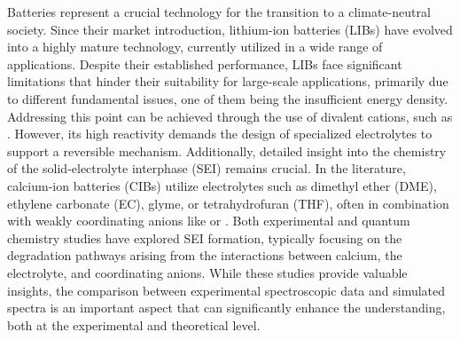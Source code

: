 \documentclass[journal=jpccck,manuscript=article]{achemso}
\begin{document}
Batteries represent a crucial technology for the transition to a climate-neutral society. Since their market introduction, lithium-ion batteries (LIBs) have evolved into a highly mature technology, currently utilized in a wide range of applications.\cite{zubiLithiumionBatteryState2018,kimLithiumionBatteriesOutlook2019} Despite their established performance, LIBs face significant limitations that hinder their suitability for large-scale applications, primarily due to different fundamental issues, one of them being the insufficient energy density.\cite{luReviewKeyIssues2013,li30YearsLithiumIon2018} Addressing this point can be achieved through the use of divalent cations, such as .\cite{arroyo-dedompabloAchievementsChallengesProspects2020,taghavi-kahaghPoweringFutureComprehensive2024} However, its high reactivity demands the design of specialized electrolytes to support a reversible mechanism. Additionally, detailed insight into the chemistry of the solid-electrolyte interphase (SEI) remains crucial.\cite{melemedImpactDifferentialCa22023,zhaoRevealingSolidElectrolyte2022}
In the literature, calcium-ion batteries (CIBs) utilize electrolytes such as dimethyl ether (DME), ethylene carbonate (EC), glyme, or tetrahydrofuran (THF), often in combination with weakly coordinating anions like  or  \cite{songElectrolyteOptimizationInterphase2022,zhaoRevealingSolidElectrolyte2022,bodinBoronBasedFunctionalAdditives2023}. 
Both experimental \cite{songElectrolyteOptimizationInterphase2022,melemedImpactDifferentialCa22023,bodinBoronBasedFunctionalAdditives2023} and quantum chemistry studies \cite{hahnCriticalRoleConfigurational2020,liepinyaComputationalComparisonEther2021,yamijalaStabilityCalciumIon2021} have explored SEI formation, typically focusing on the degradation pathways arising from the interactions between calcium, the electrolyte, and coordinating anions\cite{wuUnderstandingSolidElectrolyte2021,bodinBoronBasedFunctionalAdditives2023}. While these studies provide valuable insights, the comparison between experimental spectroscopic data and simulated spectra is an important aspect that can significantly enhance the understanding, both at the experimental and theoretical level.
\end{document}
